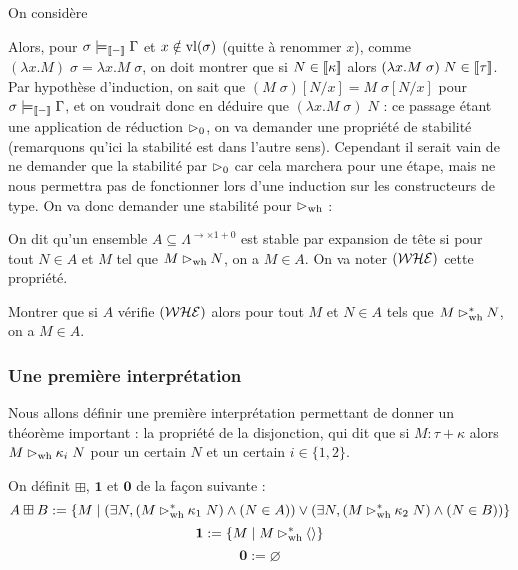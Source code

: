 On considère \begin{center}
    \begin{prooftree}
    \end{prooftree}
\end{center}
Alors, pour $\sigma\models_{\trad -}\Gamma$ et $x\notin\varlib\sigma$ (quitte à renommer $x$), comme $(\lambda x.M)\;\sigma = \lambda x.M\;\sigma$, on doit montrer que si $N\in\trad\kappa$ alors $(\lambda x.M\;\sigma)\;N\in\trad\tau$. Par hypothèse d'induction, on sait que $(M\;\sigma)[N/x] = M\;\sigma[N/x]$ pour $\sigma\models_{\trad -}\Gamma$, et on voudrait donc en déduire que $(\lambda x.M\;\sigma)\;N$ : ce passage étant une application de réduction $\reduc_0$, on va demander une propriété de stabilité (remarquons qu'ici la stabilité est dans l'autre sens). Cependant il serait vain de ne demander que la stabilité par $\reduc_0$ car cela marchera pour une étape, mais ne nous permettra pas de fonctionner lors d'une induction sur les constructeurs de type. On va donc demander une stabilité pour $\whr$ :

\begin{defi}
    On dit qu'un ensemble $A\subseteq \Lambda^{\to\times1+0}$ est stable par expansion de tête si pour tout $N\in A$ et $M$ tel que $M\whr N$, on a $M\in A$. On va noter $\WHE$ cette propriété.
\end{defi}

\begin{exo}
    Montrer que si $A$ vérifie $\WHE$ alors pour tout $M$ et $N\in A$ tels que $M\whr^* N$, on a $M\in A$.
\end{exo}

\subsubsection{Une première interprétation}

Nous allons définir une première interprétation permettant de donner un théorème important : la propriété de la disjonction, qui dit que si $M : \tau+\kappa$ alors $M\whr\kappa_i\;N$ pour un certain $N$ et un certain $i\in\{1,2\}$.

\begin{defi}
    On définit $\boxplus$, $\boldsymbol 1$ et $\boldsymbol 0$ de la façon suivante :
    $$A\boxplus B := \{ M\mid (\exists N, (M\whr^* \kappa_1\;N)\land (N\in A))\lor (\exists N, (M\whr^* \kappa_2\;N)\land(N\in B))\}$$
    $$\boldsymbol 1 := \{ M\mid M\whr^* \langle\rangle\}$$
    $$\boldsymbol 0 := \varnothing$$
\end{defi}

